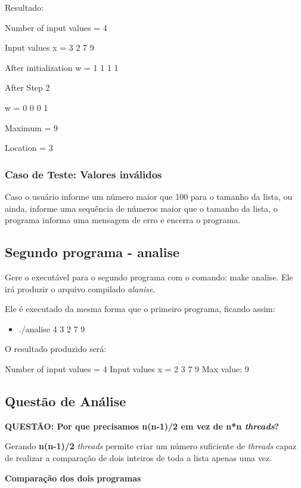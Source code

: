     Resultado:


      Number of input values = 4

      Input values x = 3 2 7 9

      After initialization w = 1 1 1 1

      After Step 2

      w = 0 0 0 1

      Maximum = 9

      Location = 3



  \subsubsection{Caso de Teste: Valores inválidos}

  Caso o usuário informe um número maior que 100 para o tamanho da lista, ou ainda, informe uma sequência de números maior que o tamanho da lista, o programa informa uma mensagem de erro e encerra o programa.


\subsection{Segundo programa - analise}

  Gere o executável para o segundo programa com o comando: make analise. Ele irá produzir o arquivo compilado \textit{alanise}.

  Ele é executado da mesma forma que o primeiro programa, ficando assim:

  \begin{itemize}
    \item ./analise 4 3 2 7 9
  \end{itemize}

  O resultado produzido será:

  Number of input values = 4
  Input values x = 2 3 7 9
  Max value: 9

\subsection{Questão de Análise}

  \textbf{QUESTÃO: Por que precisamos n(n-1)/2 em vez de n*n \textit{threads}?}

  Gerando \textbf{n(n-1)/2} \textit{threads} permite criar um número suficiente de \textit{threads} capaz de realizar a comparação de dois inteiros de toda a lista apenas uma vez.

  \textbf{Comparação dos dois programas}

